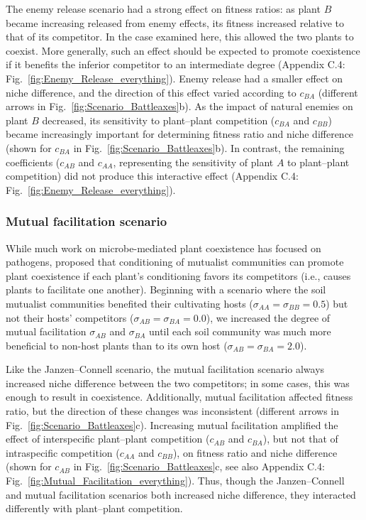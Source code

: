 The enemy release scenario had a strong effect on fitness ratios: as plant $B$ became increasing released from enemy effects, its fitness increased relative to that of its competitor. In the case examined here, this allowed the two plants to coexist. More generally, such an effect should be expected to promote coexistence if it benefits the inferior competitor to an intermediate degree (Appendix C.4: Fig.~\ref{fig:Enemy_Release_everything}). Enemy release had a smaller effect on niche difference, and the direction of this effect varied according to $c_{BA}$ (different arrows in Fig.~\ref{fig:Scenario_Battleaxes}b). As the impact of natural enemies on plant $B$ decreased, its sensitivity to plant--plant competition ($c_{BA}$ and $c_{BB}$) became increasingly important for determining fitness ratio and niche difference (shown for $c_{BA}$ in Fig.~\ref{fig:Scenario_Battleaxes}b). In contrast, the remaining coefficients ($c_{AB}$ and $c_{AA}$, representing the sensitivity of plant $A$ to plant--plant competition) did not produce this interactive effect (Appendix C.4: Fig.~\ref{fig:Enemy_Release_everything}).
\par



\subsubsection*{Mutual facilitation scenario}
While much work on microbe-mediated plant coexistence has focused on pathogens, \citet{Bever2002} proposed that conditioning of mutualist communities can promote plant coexistence if each plant's conditioning favors its competitors (i.e., causes plants to facilitate one another). Beginning with a scenario where the soil mutualist communities benefited their cultivating hosts ($\sigma_{AA} = \sigma_{BB} = 0.5$) but not their hosts' competitors ($\sigma_{AB} = \sigma_{BA} = 0.0$), we increased the degree of mutual facilitation $\sigma_{AB}$ and $\sigma_{BA}$ until each soil community was much more beneficial to non-host plants than to its own host ($\sigma_{AB} = \sigma_{BA} = 2.0$).
\par


Like the Janzen--Connell scenario, the mutual facilitation scenario always increased niche difference between the two competitors; in some cases, this was enough to result in coexistence. Additionally, mutual facilitation affected fitness ratio, but the direction of these changes was inconsistent (different arrows in Fig.~\ref{fig:Scenario_Battleaxes}c).
Increasing mutual facilitation amplified the effect of interspecific plant--plant competition ($c_{AB}$ and $c_{BA}$), but not that of intraspecific competition ($c_{AA}$ and $c_{BB}$), on fitness ratio and niche difference (shown for $c_{AB}$ in Fig.~\ref{fig:Scenario_Battleaxes}c, see also Appendix C.4: Fig.~\ref{fig:Mutual_Facilitation_everything}). Thus, though the Janzen--Connell and mutual facilitation scenarios both increased niche difference, they interacted differently with plant--plant competition.
\par



